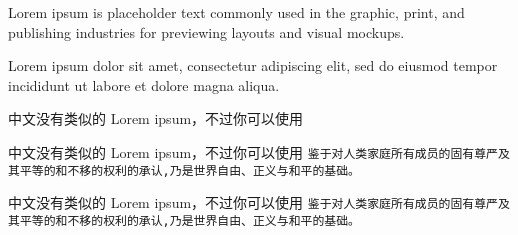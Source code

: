 \documentclass[11pt]{ctexart}
\begin{document}
Lorem ipsum is placeholder text commonly used in the graphic, print, and publishing industries for previewing layouts and visual mockups.
\begin{verbatim*}Lorem ipsum dolor sit amet, consectetur adipiscing elit, sed do eiusmod tempor incididunt ut labore et dolore magna aliqua.\end{verbatim*}

中文没有类似的 Lorem ipsum，不过你可以使用 

中文没有类似的 Lorem ipsum，不过你可以使用 \texttt{鉴于对人类家庭所有成员的固有尊严及其平等的和不移的权利的承认,乃是世界自由、正义与和平的基础。}

中文没有类似的 Lorem ipsum，不过你可以使用 \texttt{鉴于对人类家庭所有成员的固有尊严及其平等的和不移的权利的承认,乃是世界自由、正义与和平的基础。}
\end{document}

